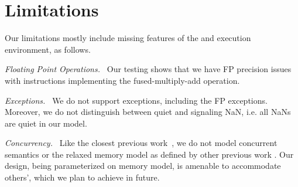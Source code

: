 \section{Limitations}\label{sec:limit}
Our limitations mostly include missing features of the \ISA and execution environment, as follows.

\emph{Floating Point Operations.~}
Our testing shows that we have FP precision issues with instructions implementing the fused-multiply-add operation. 

\emph{Exceptions.~}
We do not support exceptions, including the FP exceptions. Moreover, we do not distinguish between quiet and signaling NaN, i.e. all NaNs are quiet in our model. 

\emph{Concurrency.~}
Like the closest previous work~\cite{Goel:FMCAD14,Heule2016a}, we do not model concurrent semantics or the relaxed memory model as defined by other previous work \cite{Sarkar:POPL09,Owens:x86-TSO}. Our design, being parameterized on memory model, is amenable to accommodate others', which we plan to achieve in future.


